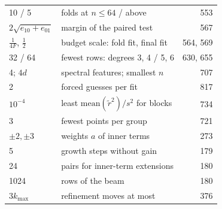 \begin{minipage}[t]{0.47\linewidth}
\begin{tabularx}{\linewidth}[t]{@{}l@{\hspace{5pt}}>{\raggedright\arraybackslash}Xr@{}}
10 / 5 & folds at $n\le64$ / above & 553\\
$2\sqrt{e_{10}+e_{01}}$ & margin of the paired test & 567\\
$\frac1{4F}$, $\frac12$ & budget scale: fold fit, final fit & 564, 569\\
32 / 64 & fewest rows: degrees 3, 4 / 5, 6 & 630, 655\\
4; $4d$ & spectral features; smallest $n$ & 707\\
2 & forced guesses per fit & 817\\
$10^{-4}$ & least $\mathrm{mean}(\tilde r^2)/s^2$ for blocks & 734\\
3 & fewest points per group & 721\\
$\pm2,\pm3$ & weights $a$ of inner terms & 273\\
5 & growth steps without gain & 179\\
24 & pairs for inner-term extensions & 180\\
1024 & rows of the beam & 180\\
$3k_{\max}$ & refinement moves at most & 376\\
\bottomrule
\end{tabularx}
\end{minipage}
